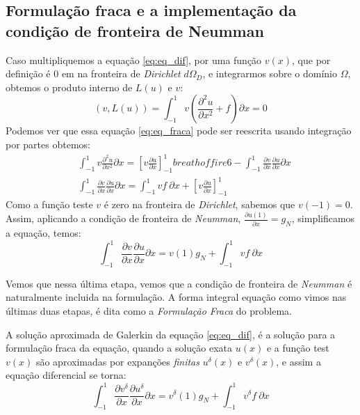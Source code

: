 \subsection{Formulação fraca e a implementação da condição de fronteira de Neumman}
 Caso multipliquemos a equação \eqref{eq:eq_dif}, por uma função $v(x)$, que por definição é 0 em na fronteira de \emph{Dirichlet} $d\Omega_D$, e integrarmos sobre o domínio $\Omega$, obtemos o produto interno de $L(u)$ e $v$:
 \begin{equation}\label{eq:eq_fraca}
 (v,L(u))=\int^1_{-1} v\left ( \frac{\partial^2u}{\partial x^2} + f \right )\partial x = 0
 \end{equation}
 Podemos ver que essa equação \eqref{eq:eq_fraca} pode ser reescrita usando integração por partes obtemos:
 \begin{align}
& \int^{1}_{-1} v \frac{\partial^2 u}{\partial x^2} \partial x = \left [ v\frac{\partial u}{\partial x}    \right ]^{1}_{-1}breath of fire 6 - \int^{1}_{-1} \frac{\partial v}{\partial x}  \frac{\partial u}{\partial x}  \partial x \\
&  \int^{1}_{-1} \frac{\partial v}{\partial x}  \frac{\partial u}{\partial x}  \partial x =  \int^{1}_{-1}  v f\ \partial x  + \left [ v\frac{\partial u}{\partial x}    \right ]^{1}_{-1} 
 \end{align}
 Como a função teste $v$ é zero na fronteira de \emph{Dirichlet}, sabemos que $v(-1) = 0$. Assim, aplicando a condição de fronteira de \emph{Neumman}, $\frac{\partial u(1)}{\partial x} = g_N$, simplificamos a equação, temos:
 \begin{equation}
 \int^{1}_{-1} \frac{\partial v}{\partial x}  \frac{\partial u}{\partial x}  \partial x =  v(1)g_N + \int^{1}_{-1}  v f\ \partial x  
\end{equation}

Vemos que nessa última etapa, vemos que a condição de fronteira de \emph{Neumman} é naturalmente incluida na formulação. A forma integral  equação como vimos nas últimas duas etapas, é dita como a \emph{Formulação Fraca} do problema.

A solução aproximada de Galerkin da equação \eqref{eq:eq_dif}, é a solução para a formulação fraca da equação, quando a solução exata $u(x)$ e a função test $v(x)$ são aproximadas por expanções \emph{finitas} $u^\delta(x)$ e $v^\delta(x)$, e assim a  equação diferencial se torna:
\begin{equation}\label{eq:eqdif_neumann}
 \int^{1}_{-1} \frac{\partial v^\delta}{\partial x}  \frac{\partial u^\delta}{\partial x}  \partial x =  v^\delta(1)g_N + \int^{1}_{-1}  v^\delta f\ \partial x 
\end{equation}
